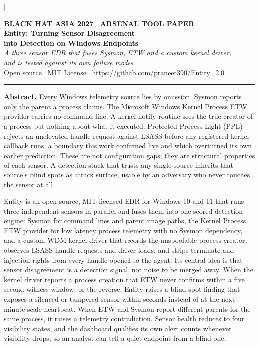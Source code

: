 \documentclass[10pt,twocolumn,letterpaper]{article}
\begin{document}

\twocolumn[{%
\begin{center}
  {\sffamily\footnotesize\bfseries\color{BHRed}
   BLACK HAT ASIA 2027 \textbullet\ ARSENAL TOOL PAPER}\\[8pt]
  {\sffamily\bfseries\LARGE\color{Ink}
   Entity: Turning Sensor Disagreement\\[3pt]
   into Detection on Windows Endpoints}\\[8pt]
  {\normalsize\itshape
   A three sensor EDR that fuses Sysmon, ETW and a custom kernel driver,\\
   and is tested against its own failure modes}\\[6pt]
  {\small\sffamily Open source \textbullet\ MIT License \textbullet\
   \url{https://github.com/praneet390/Entity_2.0}}
\end{center}
\vspace{4pt}
{\color{BHRed}\rule{\textwidth}{0.6pt}}
\vspace{2pt}

\noindent\begin{minipage}{\textwidth}
\small
{\sffamily\bfseries\color{BHRed} Abstract.}\enspace
Every Windows telemetry source lies by omission. Sysmon reports only the parent a
process claims. The Microsoft Windows Kernel Process ETW provider carries no command
line. A kernel notify routine sees the true creator of a process but nothing about what
it executed. Protected Process Light (PPL) rejects an unelevated handle request against
LSASS before any registered kernel callback runs, a boundary this work confirmed live and
which overturned its own earlier prediction. These are not configuration gaps; they are
structural properties of each sensor. A detection stack that trusts any single source
inherits that source's blind spots as attack surface, usable by an adversary who never
touches the sensor at all.

\smallskip
Entity is an open source, MIT licensed EDR for Windows 10 and 11 that runs three
independent sensors in parallel and fuses them into one scored detection engine: Sysmon
for command lines and parent image paths, the Kernel Process ETW provider for low latency
process telemetry with no Sysmon dependency, and a custom WDM kernel driver that records
the unspoofable process creator, observes LSASS handle requests and driver loads, and
strips terminate and injection rights from every handle opened to the agent. Its central
idea is that sensor disagreement is a detection signal, not noise to be merged away. When
the kernel driver reports a process creation that ETW never confirms within a five second
witness window, or the reverse, Entity raises a blind spot finding that exposes a silenced
or tampered sensor within seconds instead of at the next minute scale heartbeat. When ETW
and Sysmon report different parents for the same process, it raises a telemetry
contradiction. Sensor health reduces to four visibility states, and the dashboard
qualifies its own alert counts whenever visibility drops, so an analyst can tell a quiet
endpoint from a blind one.


\end{minipage}}
\end{document}
